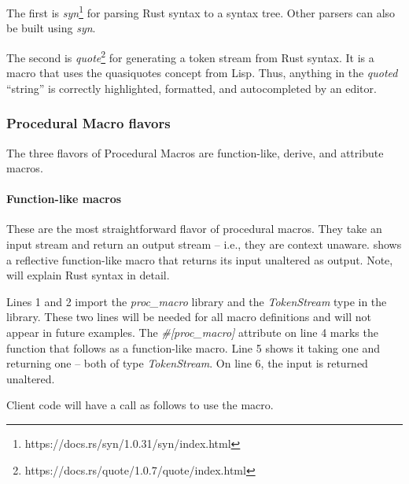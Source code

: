 The first is \textit{syn}\footnote{https://docs.rs/syn/1.0.31/syn/index.html} for parsing Rust syntax to a syntax tree.
Other parsers can also be built using \textit{syn}.

The second is \textit{quote}\footnote{https://docs.rs/quote/1.0.7/quote/index.html} for generating a token stream from Rust syntax.
It is a macro that uses the quasiquotes concept from Lisp.
Thus, anything in the \textit{quoted} ``string'' is correctly highlighted, formatted, and autocompleted by an editor.

\subsubsection{Procedural Macro flavors}
\label{sec:procedural-macro-flavors}

\newcommand{\functionh}[1]{\highlight[Yellow!100!]{#1}}
\newcommand{\inputh}[1]{\highlight[Blue!40!]{#1}}
\newcommand{\outputh}[1]{\highlight[Green!40!]{#1}}
\newcommand{\contexth}[1]{\highlight[Red!40!]{#1}}

The three flavors of Procedural Macros are function-like, derive, and attribute macros.

\paragraph{Function-like macros}
\label{sec:function-like-macro}
These are the most straightforward flavor of procedural macros.
They take an input stream and return an output stream -- i.e., they are context unaware.
 shows a reflective function-like macro that returns its input unaltered as output.
Note,  will explain Rust syntax in detail.


Lines 1 and 2 import the \textit{proc\_macro} library and the \textit{TokenStream} type in the library.
These two lines will be needed for all macro definitions and will not appear in future examples.
The \textit{\#[proc\_macro]} attribute on line 4 marks the function that follows as a function-like macro.
Line 5 shows it taking one \inputh{input} and returning one \outputh{output} -- both of type \textit{TokenStream}.
On line 6, the input is returned unaltered.

Client code will have a call as follows to use the macro.


